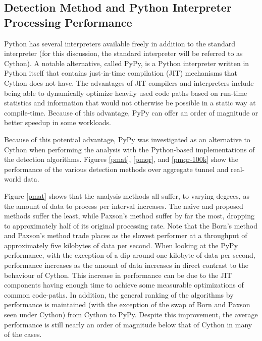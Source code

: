 \documentclass[12pt]{report}
\theoremstyle{remark}
\theoremstyle{definition}
\theoremstyle{definition}
\theoremstyle{definition}
\begin{document}
\subsection{Detection Method and Python Interpreter Processing Performance}
\label{processing-perf}
Python has several interpreters available freely in addition to the standard
interpreter (for this discussion, the standard interpreter will be referred to
as Cython). A notable alternative, called PyPy, is a Python interpreter written
in Python itself that contains just-in-time compilation (JIT) mechanisms that
Cython does not have. The advantages of JIT compilers and interpreters include
being able to dynamically optimize heavily used code paths based on run-time
statistics and information that would not otherwise be possible in a static way
at compile-time. Because of this advantage, PyPy can offer an order of magnitude
or better speedup\cite{pypyvc-strfmt} in some workloads.

Because of this potential advantage, PyPy was investigated as an alternative to
Cython when performing the analysis with the Python-based implementations of the
detection algorithms. Figures \ref{pmat}, \ref{pmqr}, and \ref{pmqr-100k} show
the performance of the various detection methods over aggregate tunnel and
real-world data.

Figure \ref{pmat} shows that the analysis methods all suffer, to varying
degrees, as the amount of data to process per interval increases. The naive and
proposed methods suffer the least, while Paxson's method suffer by far the most,
dropping to approximately half of its original processing rate. Note that the
Born's method and Paxson's method trade places as the slowest performer at a
throughput of approximately five kilobytes of data per second. When looking at
the PyPy performance, with the exception of a dip around one kilobyte of data
per second, performance increases as the amount of data increases in direct
contrast to the behaviour of Cython. This increase in performance can be due to
the JIT components having enough time to achieve some measurable optimizations
of common code-paths. In addition, the general ranking of the algorithms by
performance is maintained (with the exception of the swap of Born and Paxson
seen under Cython) from Cython to PyPy. Despite this improvement, the average
performance is still nearly an order of magnitude below that of Cython in many
of the cases.
\end{document}

